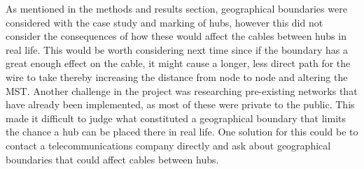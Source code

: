 \documentclass[twocolumn]{article}
\begin{document}
As mentioned in the methods and results section, geographical boundaries were considered with the case study and marking of hubs, however this did not consider the consequences of how these would affect the cables between hubs in real life. This would be worth considering next time since if the boundary has a great enough effect on the cable, it might cause a longer, less direct path for the wire to take thereby increasing the distance from node to node and altering the MST. Another challenge in the project was researching pre-existing networks that have already been implemented, as most of these were private to the public. This made it difficult to judge what constituted a geographical boundary that limits the chance a hub can be placed there in real life. One solution for this could be to contact a telecommunications company directly and ask about geographical boundaries that could affect cables between hubs. 






\end{document}
